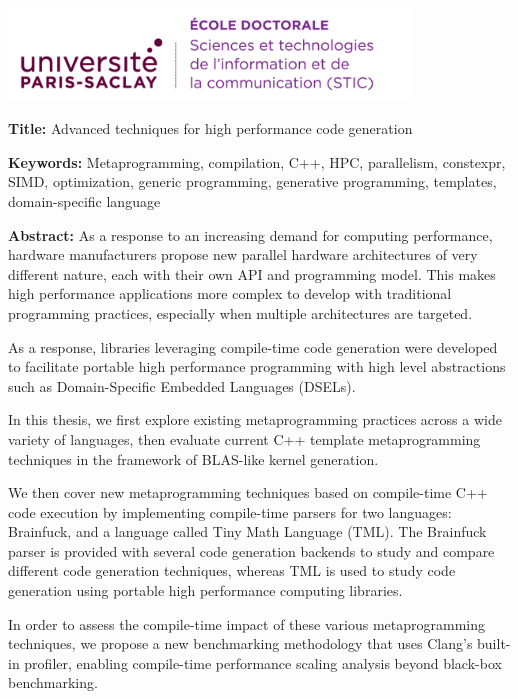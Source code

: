 \documentclass[english,12pt,a4paper]{book}
\begin{document}
\clearpage

\thispagestyle{empty}

\noindent
\includegraphics[height=2.45cm]{ups/logo_STIC.png}
\vspace{1cm}

\small
\begin{mdframed}[linecolor=Prune,linewidth=1]

\textbf{Title:} Advanced techniques for high performance code generation

\noindent \textbf{Keywords:}
Metaprogramming, compilation, C++, HPC, parallelism, constexpr, SIMD,
optimization, generic programming, generative programming,
templates, domain-specific language

\begin{multicols}{2}
\noindent \textbf{Abstract:}
As a response to an increasing demand for computing performance,
hardware manufacturers propose new parallel hardware architectures
of very different nature, each with their own API and programming model.
This makes high performance applications more complex to develop
with traditional programming practices, especially when multiple architectures
are targeted.

As a response, libraries leveraging compile-time code generation were developed
to facilitate portable high performance programming with high level abstractions
such as Domain-Specific Embedded Languages (DSELs).

In this thesis, we first explore existing metaprogramming practices across
a wide variety of languages, then evaluate current C++ template metaprogramming
techniques in the framework of BLAS-like kernel generation.

We then cover new metaprogramming techniques based on compile-time
C++ code execution by implementing compile-time parsers for two languages:
Brainfuck, and a language called Tiny Math Language (TML).
The Brainfuck parser is provided with several code generation backends
to study and compare different code generation techniques, whereas TML is used
to study code generation using portable high performance computing libraries.

In order to assess the compile-time impact of these various metaprogramming
techniques, we propose a new benchmarking methodology that uses
Clang's built-in profiler, enabling compile-time performance scaling analysis
beyond black-box benchmarking.
\end{multicols}
\end{mdframed}
\end{document}
